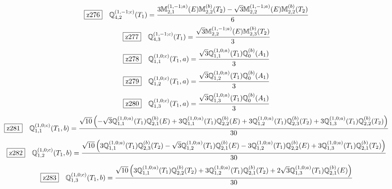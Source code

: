\documentclass[fleqn,10pt,landscape]{jsarticle}
\begin{document}
\begin{dmath*}
\hspace*{3mm}\fbox{z276}\quad \mathbb{Q}_{4,2}^{(1,-1;c)}(T_{1})=\frac{3 \mathbb{M}_{2,1}^{(1,-1;a)}(E) \mathbb{M}_{2,2}^{(b)}(T_{2}) - \sqrt{3} \mathbb{M}_{2,2}^{(1,-1;a)}(E) \mathbb{M}_{2,2}^{(b)}(T_{2})}{6}
\end{dmath*}
\begin{dmath*}
\hspace*{3mm}\fbox{z277}\quad \mathbb{Q}_{4,3}^{(1,-1;c)}(T_{1})=\frac{\sqrt{3} \mathbb{M}_{2,2}^{(1,-1;a)}(E) \mathbb{M}_{2,3}^{(b)}(T_{2})}{3}
\end{dmath*}
\begin{dmath*}
\hspace*{3mm}\fbox{z278}\quad \mathbb{Q}_{1,1}^{(1,0;c)}(T_{1},a)=\frac{\sqrt{3} \mathbb{Q}_{1,1}^{(1,0;a)}(T_{1}) \mathbb{Q}_{0}^{(b)}(A_{1})}{3}
\end{dmath*}
\begin{dmath*}
\hspace*{3mm}\fbox{z279}\quad \mathbb{Q}_{1,2}^{(1,0;c)}(T_{1},a)=\frac{\sqrt{3} \mathbb{Q}_{1,2}^{(1,0;a)}(T_{1}) \mathbb{Q}_{0}^{(b)}(A_{1})}{3}
\end{dmath*}
\begin{dmath*}
\hspace*{3mm}\fbox{z280}\quad \mathbb{Q}_{1,3}^{(1,0;c)}(T_{1},a)=\frac{\sqrt{3} \mathbb{Q}_{1,3}^{(1,0;a)}(T_{1}) \mathbb{Q}_{0}^{(b)}(A_{1})}{3}
\end{dmath*}
\begin{dmath*}
\hspace*{3mm}\fbox{z281}\quad \mathbb{Q}_{1,1}^{(1,0;c)}(T_{1},b)=\frac{\sqrt{10} \left(- \sqrt{3} \mathbb{Q}_{1,1}^{(1,0;a)}(T_{1}) \mathbb{Q}_{2,1}^{(b)}(E) + 3 \mathbb{Q}_{1,1}^{(1,0;a)}(T_{1}) \mathbb{Q}_{2,2}^{(b)}(E) + 3 \mathbb{Q}_{1,2}^{(1,0;a)}(T_{1}) \mathbb{Q}_{2,3}^{(b)}(T_{2}) + 3 \mathbb{Q}_{1,3}^{(1,0;a)}(T_{1}) \mathbb{Q}_{2,2}^{(b)}(T_{2})\right)}{30}
\end{dmath*}
\begin{dmath*}
\hspace*{3mm}\fbox{z282}\quad \mathbb{Q}_{1,2}^{(1,0;c)}(T_{1},b)=\frac{\sqrt{10} \left(3 \mathbb{Q}_{1,1}^{(1,0;a)}(T_{1}) \mathbb{Q}_{2,3}^{(b)}(T_{2}) - \sqrt{3} \mathbb{Q}_{1,2}^{(1,0;a)}(T_{1}) \mathbb{Q}_{2,1}^{(b)}(E) - 3 \mathbb{Q}_{1,2}^{(1,0;a)}(T_{1}) \mathbb{Q}_{2,2}^{(b)}(E) + 3 \mathbb{Q}_{1,3}^{(1,0;a)}(T_{1}) \mathbb{Q}_{2,1}^{(b)}(T_{2})\right)}{30}
\end{dmath*}
\begin{dmath*}
\hspace*{3mm}\fbox{z283}\quad \mathbb{Q}_{1,3}^{(1,0;c)}(T_{1},b)=\frac{\sqrt{10} \left(3 \mathbb{Q}_{1,1}^{(1,0;a)}(T_{1}) \mathbb{Q}_{2,2}^{(b)}(T_{2}) + 3 \mathbb{Q}_{1,2}^{(1,0;a)}(T_{1}) \mathbb{Q}_{2,1}^{(b)}(T_{2}) + 2 \sqrt{3} \mathbb{Q}_{1,3}^{(1,0;a)}(T_{1}) \mathbb{Q}_{2,1}^{(b)}(E)\right)}{30}
\end{dmath*}
\end{document}
